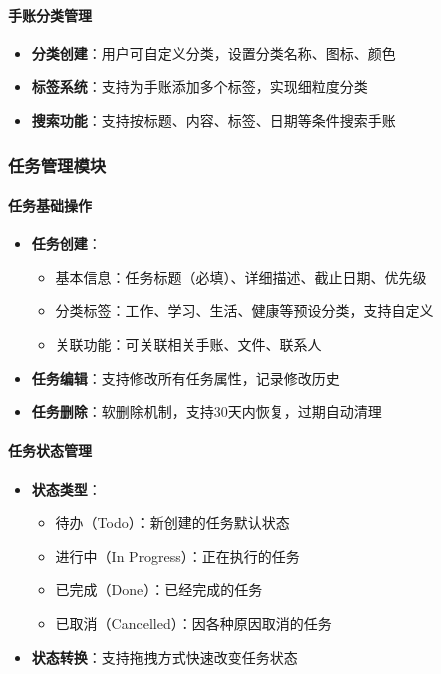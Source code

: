 \documentclass[a4paper]{article}
\begin{document}
\paragraph{手账分类管理}
\begin{itemize}
    \item \textbf{分类创建}：用户可自定义分类，设置分类名称、图标、颜色
    \item \textbf{标签系统}：支持为手账添加多个标签，实现细粒度分类
    \item \textbf{搜索功能}：支持按标题、内容、标签、日期等条件搜索手账
\end{itemize}

\subsubsection{任务管理模块}

\paragraph{任务基础操作}
\begin{itemize}
    \item \textbf{任务创建}：
    \begin{itemize}
        \item 基本信息：任务标题（必填）、详细描述、截止日期、优先级
        \item 分类标签：工作、学习、生活、健康等预设分类，支持自定义
        \item 关联功能：可关联相关手账、文件、联系人
    \end{itemize}
    \item \textbf{任务编辑}：支持修改所有任务属性，记录修改历史
    \item \textbf{任务删除}：软删除机制，支持30天内恢复，过期自动清理
\end{itemize}

\paragraph{任务状态管理}
\begin{itemize}
    \item \textbf{状态类型}：
    \begin{itemize}
        \item 待办（Todo）：新创建的任务默认状态
        \item 进行中（In Progress）：正在执行的任务
        \item 已完成（Done）：已经完成的任务
        \item 已取消（Cancelled）：因各种原因取消的任务
    \end{itemize}
    \item \textbf{状态转换}：支持拖拽方式快速改变任务状态
\end{itemize}
\end{document}
